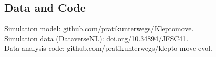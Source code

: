 \subsection*{Data and Code}
{
    \small
    Simulation model: github.com/pratikunterwegs/Kleptomove.\\ %
    \noindent Simulation data (DataverseNL): doi.org/10.34894/JFSC41.\\
    \noindent Data analysis code: github.com/pratikunterwegs/klepto-move-evol.%
}

\clearpage
